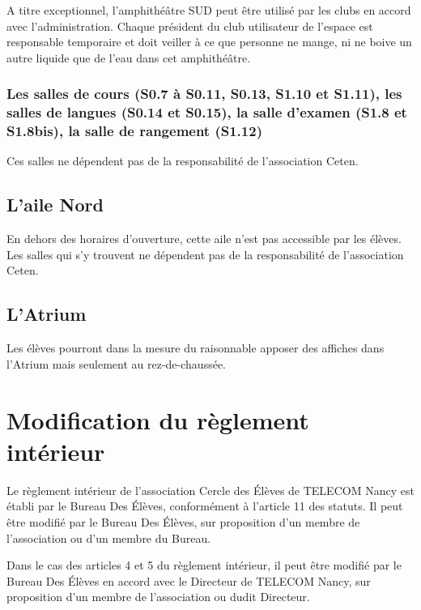 \documentclass{article} %
\begin{document}
				A titre exceptionnel, l’amphithéâtre SUD peut être utilisé par
				les clubs en accord avec l’administration. Chaque président du
				club utilisateur de l’espace est responsable temporaire et doit
				veiller à ce que personne ne mange, ni ne boive un autre
				liquide que de l’eau dans cet amphithéâtre.

			\subsubsection{Les salles de cours (S0.7 à S0.11, S0.13, S1.10 et
			S1.11), les salles de langues (S0.14 et S0.15), la salle d’examen
			(S1.8 et S1.8bis), la salle de rangement (S1.12)}

				Ces salles ne dépendent pas de la responsabilité de
				l'association Ceten.

		\subsection{L’aile Nord}

			En dehors des horaires d’ouverture, cette aile n’est pas accessible
			par les élèves. Les salles qui s’y trouvent ne dépendent pas de la
			responsabilité de l'association Ceten.

		\subsection{L’Atrium}

			Les élèves pourront dans la mesure du raisonnable apposer des
			affiches dans l’Atrium mais seulement au rez-de-chaussée.

	\section{Modification du règlement intérieur}

		Le règlement intérieur de l’association Cercle des Élèves de TELECOM
		Nancy est établi par le Bureau Des Élèves, conformément à l'article 11
		des statuts. Il peut être modifié par le Bureau Des Élèves, sur
		proposition d’un membre de l’association ou d’un membre du Bureau.

		Dans le cas des articles 4 et 5 du règlement intérieur, il peut être
		modifié par le Bureau Des Élèves en accord avec le Directeur de TELECOM
		Nancy, sur proposition d’un membre de l’association ou dudit Directeur.
\end{document}
